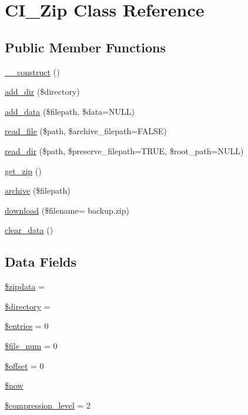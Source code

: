 \hypertarget{class_c_i___zip}{}\section{C\+I\+\_\+\+Zip Class Reference}
\label{class_c_i___zip}
\subsection*{Public Member Functions}
\begin{DoxyCompactItemize}
\item 
\hyperlink{class_c_i___zip_a095c5d389db211932136b53f25f39685}{\+\_\+\+\_\+construct} ()
\item 
\hyperlink{class_c_i___zip_a86b6a309dad105e43b446dc9f8820703}{add\+\_\+dir} (\$directory)
\item 
\hyperlink{class_c_i___zip_a8d541e6609a5b2634a6a2bc7731465a5}{add\+\_\+data} (\$filepath, \$data=N\+U\+L\+L)
\item 
\hyperlink{class_c_i___zip_aa43eef46a052a3aff7a2ff0bf5c21c75}{read\+\_\+file} (\$path, \$archive\+\_\+filepath=F\+A\+L\+S\+E)
\item 
\hyperlink{class_c_i___zip_a296847a86d7cf0e4bba9b71a173cfffe}{read\+\_\+dir} (\$path, \$preserve\+\_\+filepath=T\+R\+U\+E, \$root\+\_\+path=N\+U\+L\+L)
\item 
\hyperlink{class_c_i___zip_a263fd906f99ccca15a12fe34a79656e4}{get\+\_\+zip} ()
\item 
\hyperlink{class_c_i___zip_a935879d7074c751a4ac886aebd66cbd4}{archive} (\$filepath)
\item 
\hyperlink{class_c_i___zip_a485d204dc928fd19b711cb857e44561f}{download} (\$filename= \textquotesingle{}backup.\+zip\textquotesingle{})
\item 
\hyperlink{class_c_i___zip_a89d046bac0ab06a81c5c03d55b4bcae5}{clear\+\_\+data} ()
\end{DoxyCompactItemize}
\subsection*{Data Fields}
\begin{DoxyCompactItemize}
\item 
\hyperlink{class_c_i___zip_a395accfd5884d9a0e6fd53470b3e85b1}{\$zipdata} = \textquotesingle{}\textquotesingle{}
\item 
\hyperlink{class_c_i___zip_a1b07c630eb02f770a082a013373a16d6}{\$directory} = \textquotesingle{}\textquotesingle{}
\item 
\hyperlink{class_c_i___zip_affb4200921149b6126d0e51b415b2c75}{\$entries} = 0
\item 
\hyperlink{class_c_i___zip_af1ab53ee1a849492829ce782aac0163d}{\$file\+\_\+num} = 0
\item 
\hyperlink{class_c_i___zip_aec4de82415d7f05cb9748d12d3a95a87}{\$offset} = 0
\item 
\hyperlink{class_c_i___zip_af1d5ccdee975b8f4d20aaffc5b28557c}{\$now}
\item 
\hyperlink{class_c_i___zip_a9a4e30766e452f0d2feaecd666787ca1}{\$compression\+\_\+level} = 2
\end{DoxyCompactItemize}
